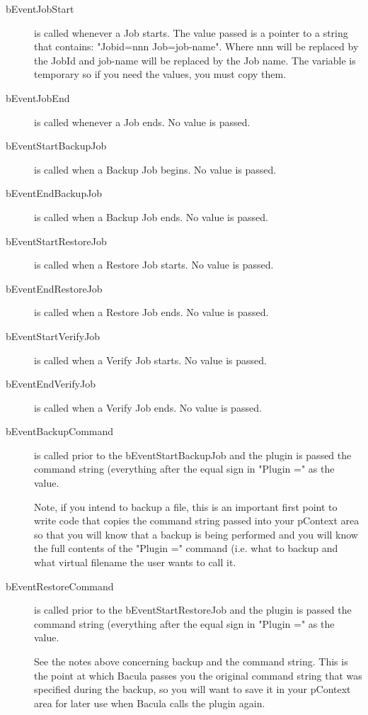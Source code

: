 \begin{description}
 \item [bEventJobStart] is called whenever a Job starts. The value
   passed is a pointer to a string that contains: "Jobid=nnn
   Job=job-name". Where nnn will be replaced by the JobId and job-name
   will be replaced by the Job name. The variable is temporary so if you
   need the values, you must copy them.

 \item [bEventJobEnd] is called whenever a Job ends. No value is passed.

 \item [bEventStartBackupJob] is called when a Backup Job begins. No value
   is passed.

 \item [bEventEndBackupJob] is called when a Backup Job ends. No value is
   passed.

 \item [bEventStartRestoreJob] is called when a Restore Job starts. No value
   is passed.

 \item [bEventEndRestoreJob] is called when a Restore Job ends. No value is
   passed.

 \item [bEventStartVerifyJob] is called when a Verify Job starts. No value
   is passed.

 \item [bEventEndVerifyJob] is called when a Verify Job ends. No value
   is passed.

 \item [bEventBackupCommand] is called prior to the bEventStartBackupJob and
   the plugin is passed the command string (everything after the equal sign
   in "Plugin =" as the value.

   Note, if you intend to backup a file, this is an important first point to
   write code that copies the command string passed into your pContext area
   so that you will know that a backup is being performed and you will know
   the full contents of the "Plugin =" command (i.e. what to backup and
   what virtual filename the user wants to call it.

 \item [bEventRestoreCommand] is called prior to the bEventStartRestoreJob and
   the plugin is passed the command string (everything after the equal sign
   in "Plugin =" as the value.

   See the notes above concerning backup and the command string. This is the
   point at which Bacula passes you the original command string that was
   specified during the backup, so you will want to save it in your pContext
   area for later use when Bacula calls the plugin again.


\end{description}

